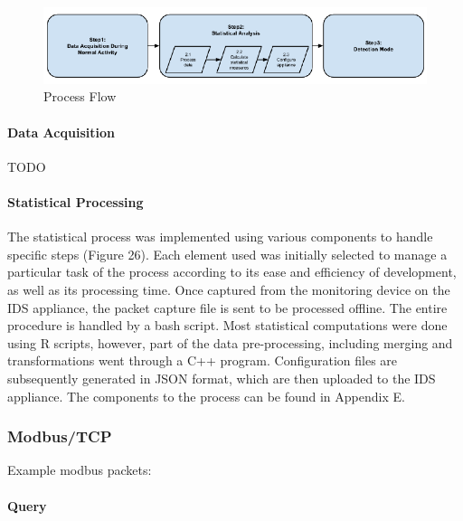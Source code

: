 \documentclass[12pt,]{article}
\begin{document}
\begin{figure}

{\centering \includegraphics{thesis_files/figure-latex/unnamed-chunk-39-1} 

}

\caption{Process Flow}\label{fig:unnamed-chunk-39}
\end{figure}

\paragraph{Data Acquisition}\label{data-acquisition}

TODO

\paragraph{Statistical Processing}\label{statistical-processing}

The statistical process was implemented using various components to
handle specific steps (Figure 26). Each element used was initially
selected to manage a particular task of the process according to its
ease and efficiency of development, as well as its processing time. Once
captured from the monitoring device on the IDS appliance, the packet
capture file is sent to be processed offline. The entire procedure is
handled by a bash script. Most statistical computations were done using
R scripts, however, part of the data pre-processing, including merging
and transformations went through a C++ program. Configuration files are
subsequently generated in JSON format, which are then uploaded to the
IDS appliance. The components to the process can be found in Appendix E.

\subsubsection{Modbus/TCP}\label{modbustcp-1}

Example modbus packets:

\paragraph{Query}\label{query}
\end{document}
